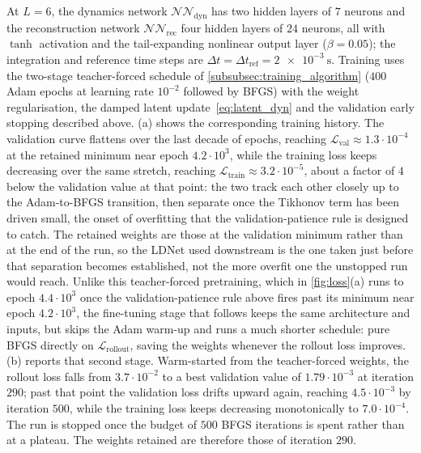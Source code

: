At $L=6$, the dynamics network $\mathcal{NN}_\mathrm{dyn}$ has two hidden layers of $7$ neurons and
the reconstruction network $\mathcal{NN}_\mathrm{rec}$ four hidden layers of $24$ neurons, all with
$\tanh$ activation and the tail-expanding nonlinear output layer ($\beta=0.05$); the integration
and reference time steps are $\Delta t=\Delta t_\mathrm{ref}=\SI{2e-3}{\second}$. Training uses the
two-stage teacher-forced schedule of \cref{subsubsec:training_algorithm} ($400$ Adam epochs at
learning rate $10^{-2}$ followed by BFGS) with the weight regularisation, the damped latent
update~\eqref{eq:latent_dyn} and the validation early stopping described above.
(a) shows the corresponding training history. The
validation curve flattens over the last decade of epochs, reaching
$\mathcal{L}_\mathrm{val}\approx1.3\cdot10^{-4}$ at the retained minimum near epoch $4.2\cdot10^{3}$,
while the training loss keeps decreasing over the same stretch, reaching
$\mathcal{L}_\mathrm{train}\approx3.2\cdot10^{-5}$, about a factor of $4$ below the validation
value at that point: the two track each other closely up to the Adam-to-BFGS
transition, then separate once the Tikhonov term has been driven small, the
onset of overfitting that the validation-patience rule is designed to
catch. The retained weights are those at the validation minimum rather than
at the end of the run, so the LDNet used downstream is the one taken just
before that separation becomes established, not the more overfit one the
unstopped run would reach. Unlike this teacher-forced
pretraining, which in \cref{fig:loss}(a) runs to epoch $4.4\cdot10^{3}$ once the validation-patience
rule above fires past its minimum near epoch $4.2\cdot10^{3}$, the fine-tuning stage that follows keeps the same architecture and inputs,
but skips the Adam warm-up and runs a much shorter schedule: pure BFGS directly
on $\mathcal{L}_\mathrm{rollout}$, saving the weights whenever the rollout loss improves.
(b) reports that second stage. Warm-started from the teacher-forced weights, the
rollout loss falls from $3.7\cdot10^{-2}$ to a best validation value of
$1.79\cdot10^{-3}$ at iteration $290$; past that point the validation loss drifts upward again,
reaching $4.5\cdot10^{-3}$ by iteration $500$, while the training loss keeps decreasing
monotonically to $7.0\cdot10^{-4}$. The run is stopped once the budget of $500$ BFGS
iterations is spent rather than at a plateau. The weights retained are therefore
those of iteration $290$.

